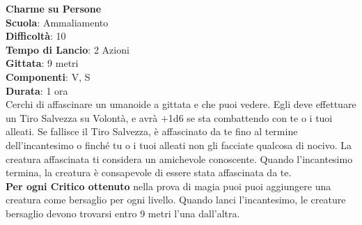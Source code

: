 \begin{multicols}{2}
\medskip\textbf{Charme su Persone}\\
\textbf{Scuola}: Ammaliamento\\
\textbf{Difficoltà}:  10\\
\textbf{Tempo di Lancio}: 2 Azioni\\
\textbf{Gittata}: 9 metri\\
\textbf{Componenti}: V, S\\
\textbf{Durata}: 1 ora\\
Cerchi di affascinare un umanoide a gittata e che puoi vedere. Egli deve effettuare un Tiro Salvezza su Volontà, e avrà +1d6 se sta combattendo con te o i tuoi alleati. Se fallisce il Tiro Salvezza, è affascinato da te fino al termine dell'incantesimo o finché tu o i tuoi alleati non gli facciate qualcosa di nocivo. La creatura affascinata ti considera un amichevole conoscente. Quando l'incantesimo termina, la creatura è consapevole di essere stata affascinata da te. \\
\textbf{Per ogni Critico ottenuto} nella prova di magia puoi puoi aggiungere una creatura come bersaglio per ogni livello. Quando lanci l'incantesimo, le creature bersaglio devono trovarsi entro 9 metri l’una dall'altra.


\end{multicols}
